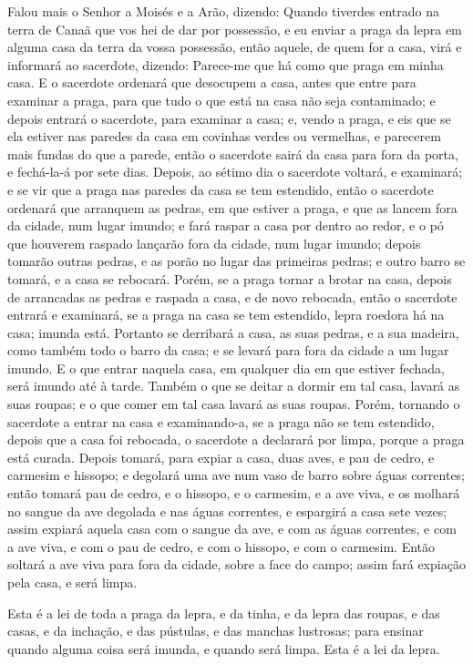 Falou mais o Senhor a Moisés e a Arão, dizendo: Quando
tiverdes entrado na terra de Canaã que vos hei de dar por possessão,
e eu enviar a praga da lepra em alguma casa da terra da vossa
possessão, então aquele, de quem for a casa, virá e informará
ao sacerdote, dizendo: Parece-me que há como que praga em minha
casa. E o sacerdote ordenará que desocupem a casa, antes que
entre para examinar a praga, para que tudo o que está na casa não
seja contaminado; e depois entrará o sacerdote, para examinar a
casa; e, vendo a praga, e eis que se ela estiver nas paredes
da casa em covinhas verdes ou vermelhas, e parecerem mais fundas do
que a parede, então o sacerdote sairá da casa para fora da
porta, e fechá-la-á por sete dias. Depois, ao sétimo dia o
sacerdote voltará, e examinará; e se vir que a praga nas paredes da
casa se tem estendido, então o sacerdote ordenará que
arranquem as pedras, em que estiver a praga, e que as lancem fora da
cidade, num lugar imundo; e fará raspar a casa por dentro ao
redor, e o pó que houverem raspado lançarão fora da cidade, num
lugar imundo; depois tomarão outras pedras, e as porão no
lugar das primeiras pedras; e outro barro se tomará, e a casa se
rebocará. Porém, se a praga tornar a brotar na casa, depois
de arrancadas as pedras e raspada a casa, e de novo rebocada,
então o sacerdote entrará e examinará, se a praga na casa se
tem estendido, lepra roedora há na casa; imunda está.
Portanto se derribará a casa, as suas pedras, e a sua
madeira, como também todo o barro da casa; e se levará para fora da
cidade a um lugar imundo. E o que entrar naquela casa, em
qualquer dia em que estiver fechada, será imundo até à tarde.
Também o que se deitar a dormir em tal casa, lavará as suas
roupas; e o que comer em tal casa lavará as suas roupas.
Porém, tornando o sacerdote a entrar na casa e examinando-a,
se a praga não se tem estendido, depois que a casa foi rebocada, o
sacerdote a declarará por limpa, porque a praga está curada.
Depois tomará, para expiar a casa, duas aves, e pau de cedro,
e carmesim e hissopo; e degolará uma ave num vaso de barro
sobre águas correntes; então tomará pau de cedro, e o
hissopo, e o carmesim, e a ave viva, e os molhará no sangue da ave
degolada e nas águas correntes, e espargirá a casa sete vezes;
assim expiará aquela casa com o sangue da ave, e com as águas
correntes, e com a ave viva, e com o pau de cedro, e com o hissopo,
e com o carmesim. Então soltará a ave viva para fora da
cidade, sobre a face do campo; assim fará expiação pela casa, e será
limpa.

Esta é a lei de toda a praga da lepra, e da tinha, e da
lepra das roupas, e das casas, e da inchação, e das pústulas,
e das manchas lustrosas; para ensinar quando alguma coisa
será imunda, e quando será limpa. Esta é a lei da lepra.

